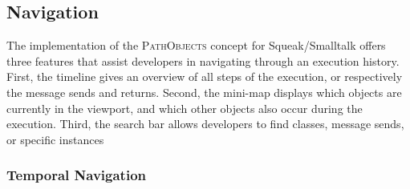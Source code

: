 \subsection{Navigation}
The implementation of the \textsc{PathObjects} concept for Squeak/Smalltalk offers three features that assist developers in navigating through an execution history.
First, the timeline gives an overview of all steps of the execution, or respectively the message sends and returns.
Second, the mini-map displays which objects are currently in the viewport, and which other objects also occur during the execution.
Third, the search bar allows developers to find classes, message sends, or specific instances

\subsubsection{Temporal Navigation}
